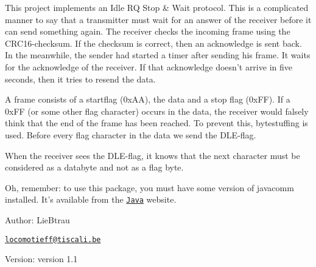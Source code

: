 This project implements an Idle RQ Stop \& Wait protocol. This is a complicated manner to say that a transmitter must wait for an answer of the receiver before it can send something again. The receiver checks the incoming frame using the CRC16-checksum. If the checksum is correct, then an acknowledge is sent back. In the meanwhile, the sender had started a timer after sending his frame. It waits for the acknowledge of the receiver. If that acknowledge doesn't arrive in five seconds, then it tries to resend the data. \par
 A frame consists of a startflag (0x\-AA), the data and a stop flag (0x\-FF). If a 0x\-FF (or some other flag character) occurs in the data, the receiver would falsely think that the end of the frame has been reached. To prevent this, bytestuffing is used. Before every flag character in the data we send the DLE-flag. \par
 When the receiver sees the DLE-flag, it knows that the next character must be considered as a databyte and not as a flag byte.

\par
 Oh, remember: to use this package, you must have some version of javacomm installed. It's available from the \href{http://java.sun.com}{\tt Java} website.

 \begin{Desc}
\item[Author:]Lie\-Btrau 

\href{mailto:locomotieff@tiscali.be}{\tt locomotieff@tiscali.be} \end{Desc}
\begin{Desc}
\item[Version:]version 1.1 \end{Desc}
